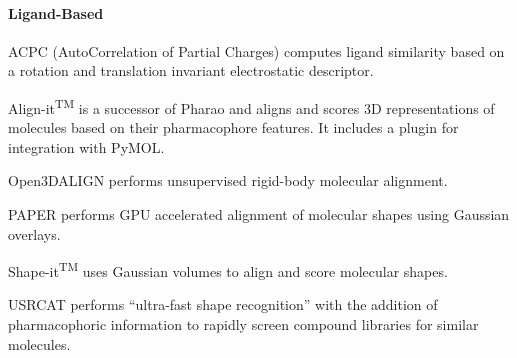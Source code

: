\paragraph{Ligand-Based}

ACPC (AutoCorrelation of Partial Charges) \cite{Berenger_2014} computes ligand similarity based on a rotation and translation invariant electrostatic descriptor.

Align-it\textsuperscript{TM} is a successor of Pharao \cite{Taminau_2008} and aligns and scores 3D representations of molecules based on their pharmacophore features.  It includes a plugin for integration with PyMOL.

Open3DALIGN \cite{Tosco_2011} performs unsupervised rigid-body molecular alignment.

PAPER \cite{Haque_2010} performs GPU accelerated alignment of molecular shapes using Gaussian overlays.

Shape-it\textsuperscript{TM} uses Gaussian volumes to align and score molecular shapes.

USRCAT \cite{Schreyer_2012} performs ``ultra-fast shape recognition'' with the addition of pharmacophoric information to rapidly screen compound libraries for similar molecules.


